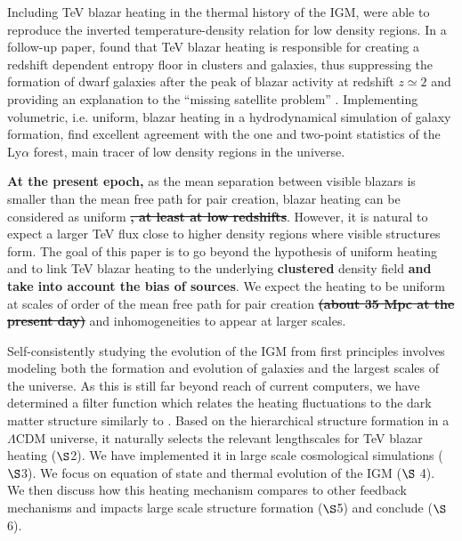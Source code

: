 \documentclass[twocolumns]{emulateapj}
\newcommand\ALc[1]{{\color{red} \bf #1}} %
\begin{document}
Including TeV blazar heating in the thermal history of the IGM, \citet{2012ApJ...752...23C} were able to reproduce the inverted temperature-density relation for low density regions. In a follow-up paper, \citet{2012ApJ...752...24P} found that TeV blazar heating is responsible for creating  a redshift dependent entropy floor in clusters and galaxies, thus suppressing the formation of dwarf galaxies after the peak of blazar activity at redshift $z\simeq2$ and providing an explanation to the ``missing satellite problem'' \citep{2010AdAst2010E...8K}. Implementing volumetric, i.e. uniform, blazar heating in a hydrodynamical simulation of galaxy formation, \citet{2012MNRAS.423..149P} find excellent agreement with the one and two-point statistics of the Ly$\alpha$ forest, main tracer of low density regions in the universe.

\ALc{At the present epoch,} as the mean separation between visible blazars is smaller than the mean free path for pair creation, blazar heating can be considered as uniform \ALc{\sout{, at least at low redshifts}}. However, it is natural to expect a larger TeV flux close to higher density regions where visible structures form. The goal of this paper is to go beyond the hypothesis of uniform heating and to link TeV blazar heating to the underlying \ALc{clustered} density field \ALc{and take into account the bias of sources}. We expect the heating to be uniform at scales of order of the mean free path for pair creation \ALc{\sout{(about 35 Mpc at the present day)}} and inhomogeneities to appear at larger scales. 

Self-consistently studying the evolution of the IGM from first principles involves modeling both the formation and evolution of galaxies and the largest scales of the universe. As this is still far beyond reach of current computers, we have determined a filter function which relates the heating fluctuations to the dark matter structure similarly to \citet{2007MNRAS.376.1680P,2005ApJ...626....1B,2014PhRvD..89h3010P}. Based on the hierarchical structure formation in a $\Lambda$CDM universe, it naturally selects the relevant lengthscales for TeV blazar heating ($\S$2). We have implemented it in large scale cosmological simulations ($\S$3). We focus on equation of state and thermal evolution of the  IGM ($\S$ 4). We then discuss how this heating mechanism compares to other feedback mechanisms and impacts large scale structure formation ($\S$5) and conclude ($\S$6).


\end{document}
